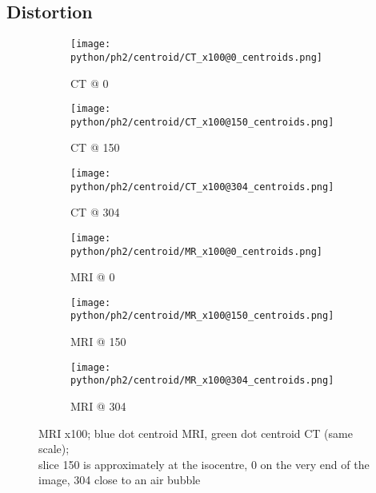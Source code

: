  
 
 



\subsection{Distortion}


\begin{figure}[!tbp]
  \begin{subfigure}[b]{0.32\textwidth}
    \texttt{[image: python/ph2/centroid/CT\_x100@0\_centroids.png]}
    \caption{CT @ 0}
    \label{fig:CT_x100_centroids@0}
  \end{subfigure}
  \begin{subfigure}[b]{0.32\textwidth}
    \texttt{[image: python/ph2/centroid/CT\_x100@150\_centroids.png]}
    \caption{CT @ 150}
    \label{fig:CT_x100_centroids@150}
  \end{subfigure}
  \begin{subfigure}[b]{0.32\textwidth}
    \texttt{[image: python/ph2/centroid/CT\_x100@304\_centroids.png]}
    \caption{CT @ 304}
    \label{fig:CT_x100_centroids@304}
  \end{subfigure}
  \begin{subfigure}[b]{0.32\textwidth}
    \texttt{[image: python/ph2/centroid/MR\_x100@0\_centroids.png]}
    \caption{MRI @ 0}
    \label{fig:MR_x100_centroids@0}
  \end{subfigure}
  \begin{subfigure}[b]{0.32\textwidth}
    \texttt{[image: python/ph2/centroid/MR\_x100@150\_centroids.png]}
    \caption{MRI @ 150}
    \label{fig:MR_x100_centroids@150}
  \end{subfigure}
  \begin{subfigure}[b]{0.32\textwidth}
    \texttt{[image: python/ph2/centroid/MR\_x100@304\_centroids.png]}
    \caption{MRI @ 304}
    \label{fig:MR_x100_centroids@304}
  \end{subfigure}
  \caption{MRI x100; blue dot centroid MRI, green dot centroid CT (same scale);\\ slice 150 is approximately at the isocentre, 0 on the very end of the image, 304 close to an air bubble}
  \label{fig:MR_x100_centroids}
\end{figure}

